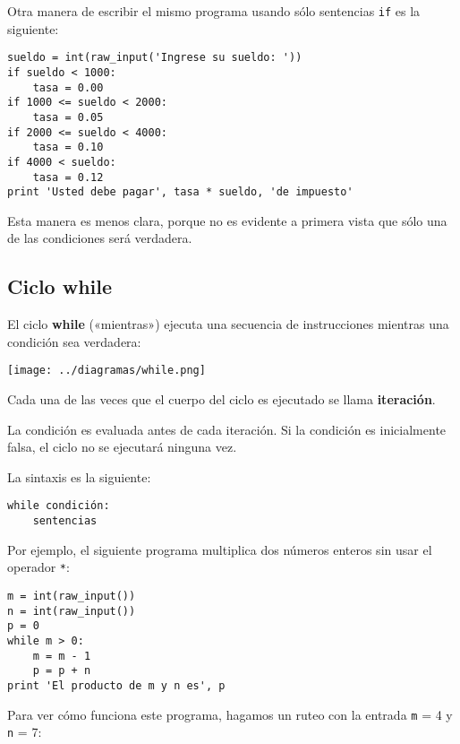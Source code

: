 Otra manera de escribir el mismo programa usando sólo sentencias
\lstinline!if! es la siguiente:

\begin{lstlisting}
sueldo = int(raw_input('Ingrese su sueldo: '))
if sueldo < 1000:
    tasa = 0.00
if 1000 <= sueldo < 2000:
    tasa = 0.05
if 2000 <= sueldo < 4000:
    tasa = 0.10
if 4000 < sueldo:
    tasa = 0.12
print 'Usted debe pagar', tasa * sueldo, 'de impuesto'
\end{lstlisting}

Esta manera es menos clara, porque no es evidente a primera vista que
sólo una de las condiciones será verdadera.

\subsection{Ciclo while}

El ciclo \textbf{while} («mientras») ejecuta una secuencia de
instrucciones mientras una condición sea verdadera:

\texttt{[image: ../diagramas/while.png]}

Cada una de las veces que el cuerpo del ciclo es ejecutado se llama
\textbf{iteración}.

La condición es evaluada antes de cada iteración. Si la condición es
inicialmente falsa, el ciclo no se ejecutará ninguna vez.

La sintaxis es la siguiente:

\begin{lstlisting}
while condición:
    sentencias
\end{lstlisting}

Por ejemplo, el siguiente programa multiplica dos números enteros sin
usar el operador \lstinline!*!:

\begin{lstlisting}
m = int(raw_input())
n = int(raw_input())
p = 0
while m > 0:
    m = m - 1
    p = p + n
print 'El producto de m y n es', p
\end{lstlisting}

Para ver cómo funciona este programa, hagamos un ruteo con la entrada
\lstinline!m! = 4 y \lstinline!n! = 7:

